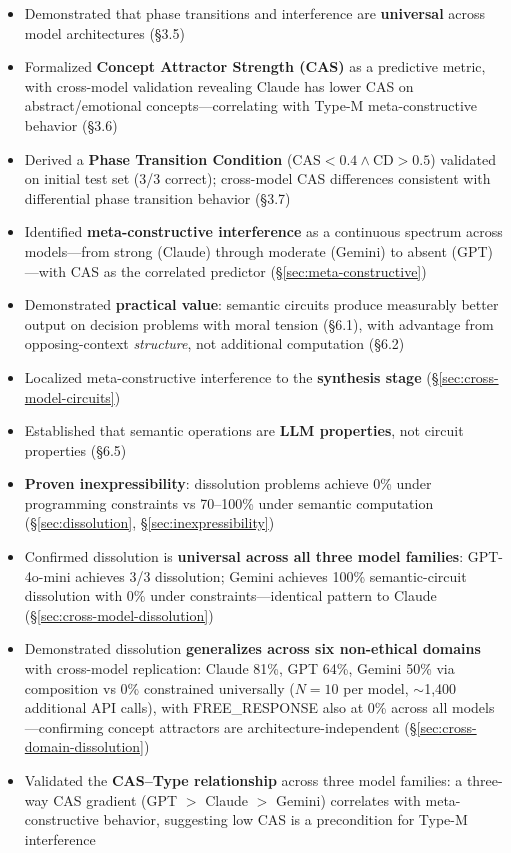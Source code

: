 \documentclass[11pt,a4paper]{article}
\newcommand{\CAS}{\mathrm{CAS}}
\newcommand{\CD}{\mathrm{CD}}
\begin{document}
\begin{itemize}[leftmargin=*]
\item Demonstrated that phase transitions and interference are \textbf{universal} across model architectures (\S3.5)
\item Formalized \textbf{Concept Attractor Strength (CAS)} as a predictive metric, with cross-model validation revealing Claude has lower CAS on abstract/emotional concepts---correlating with Type-M meta-constructive behavior (\S3.6)
\item Derived a \textbf{Phase Transition Condition} ($\CAS < 0.4 \wedge \CD > 0.5$) validated on initial test set (3/3 correct); cross-model CAS differences consistent with differential phase transition behavior (\S3.7)
\item Identified \textbf{meta-constructive interference} as a continuous spectrum across models---from strong (Claude) through moderate (Gemini) to absent (GPT)---with CAS as the correlated predictor (\S\ref{sec:meta-constructive})
\item Demonstrated \textbf{practical value}: semantic circuits produce measurably better output on decision problems with moral tension (\S6.1), with advantage from opposing-context \emph{structure}, not additional computation (\S6.2)
\item Localized meta-constructive interference to the \textbf{synthesis stage} (\S\ref{sec:cross-model-circuits})
\item Established that semantic operations are \textbf{LLM properties}, not circuit properties (\S6.5)
\item \textbf{Proven inexpressibility}: dissolution problems achieve 0\% under programming constraints vs 70--100\% under semantic computation (\S\ref{sec:dissolution}, \S\ref{sec:inexpressibility})
\item Confirmed dissolution is \textbf{universal across all three model families}: GPT-4o-mini achieves 3/3 dissolution; Gemini achieves 100\% semantic-circuit dissolution with 0\% under constraints---identical pattern to Claude (\S\ref{sec:cross-model-dissolution})
\item Demonstrated dissolution \textbf{generalizes across six non-ethical domains} with cross-model replication: Claude 81\%, GPT 64\%, Gemini 50\% via composition vs 0\% constrained universally ($N=10$ per model, $\sim$1,400 additional API calls), with FREE\_RESPONSE also at 0\% across all models---confirming concept attractors are architecture-independent (\S\ref{sec:cross-domain-dissolution})
\item Validated the \textbf{CAS--Type relationship} across three model families: a three-way CAS gradient (GPT $>$ Claude $>$ Gemini) correlates with meta-constructive behavior, suggesting low CAS is a precondition for Type-M interference

\end{itemize}
\end{document}
